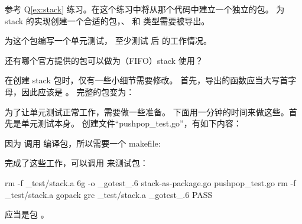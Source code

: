 \begin{Exercise}[title={stack 包},difficulty=2]
\label{ex:stack-package}
\Question\label{ex:stack-package q1} 
参考 Q\ref{ex:stack} 练习。在这个练习中将从那个代码中建立一个独立的包。
为 stack 的实现创建一个合适的包，、 和  类型需要被导出。

\Question\label{ex:stack-package q2} 为这个包编写一个单元测试，
至少测试  后  的工作情况。

\Question\label{ex:stack-package q3} 还有哪个官方提供的包可以做为（FIFO）stack 使用？
\end{Exercise}

\begin{Answer}
\Question 在创建 stack 包时，仅有一些小细节需要修改。
首先，导出的函数应当大写首字母，因此应该是 。
完整的包变为：


\Question 为了让单元测试正常工作，需要做一些准备。
下面用一分钟的时间来做这些。首先是单元测试本身。
创建文件“pushpop\_test.go”，有如下内容：

因为  调用  编译包，所以需要一个 makefile:

完成了这些工作，可以调用  来测试包：

\begin{display}
\pr {}
rm -f _test/stack.a
6g  -o _gotest_.6 stack-as-package.go  pushpop_test.go
rm -f _test/stack.a
gopack grc _test/stack.a _gotest_.6 
PASS
\end{display}

\Question 应当是包 。

\end{Answer}
